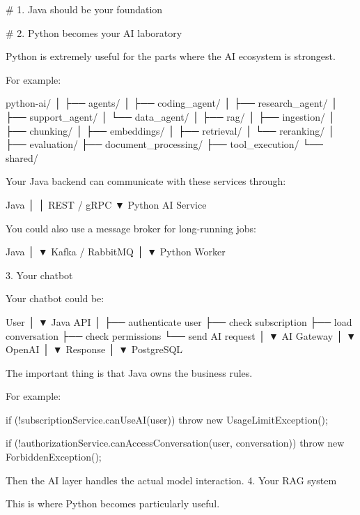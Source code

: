 # 1. Java should be your foundation





# 2. Python becomes your AI laboratory

Python is extremely useful for the parts where the AI ecosystem is strongest.

For example:

python-ai/
│
├── agents/
│   ├── coding_agent/
│   ├── research_agent/
│   ├── support_agent/
│   └── data_agent/
│
├── rag/
│   ├── ingestion/
│   ├── chunking/
│   ├── embeddings/
│   ├── retrieval/
│   └── reranking/
│
├── evaluation/
├── document_processing/
├── tool_execution/
└── shared/

Your Java backend can communicate with these services through:

Java
  │
  │ REST / gRPC
  ▼
Python AI Service

You could also use a message broker for long-running jobs:

Java
 │
 ▼
Kafka / RabbitMQ
 │
 ▼
Python Worker


3. Your chatbot

Your chatbot could be:

User
 │
 ▼
Java API
 │
 ├── authenticate user
 ├── check subscription
 ├── load conversation
 ├── check permissions
 └── send AI request
          │
          ▼
      AI Gateway
          │
          ▼
       OpenAI
          │
          ▼
       Response
          │
          ▼
      PostgreSQL

The important thing is that Java owns the business rules.

For example:

if (!subscriptionService.canUseAI(user)) {
    throw new UsageLimitException();
}

if (!authorizationService.canAccessConversation(user, conversation)) {
    throw new ForbiddenException();
}

Then the AI layer handles the actual model interaction.
4. Your RAG system

This is where Python becomes particularly useful.

